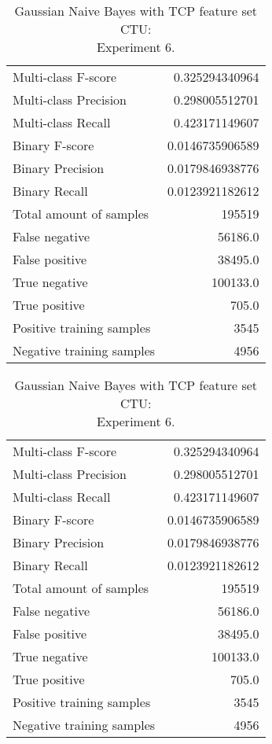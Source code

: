 \begin{table}[H]
\begin{minipage}{0.5\textwidth}
\caption{Gaussian Naive Bayes with TCP feature set CTU: \\Experiment 5.}
\centering
\begin{tabular}{l r}
\toprule
Multi-class F-score & 0.325294340964 \\
Multi-class Precision & 0.298005512701 \\
Multi-class Recall & 0.423171149607 \\
\midrule
Binary F-score & 0.0146735906589 \\
Binary Precision & 0.0179846938776 \\
Binary Recall & 0.0123921182612 \\
\midrule
Total amount of samples & 195519 \\
False negative & 56186.0 \\
False positive & 38495.0 \\
True negative & 100133.0 \\
True positive & 705.0 \\
\midrule
Positive training samples & 3545 \\
Negative training samples & 4956 \\
\bottomrule
\end{tabular}
\end{minipage}
\hfillx
\begin{minipage}{0.5\textwidth}
\caption{Gaussian Naive Bayes with TCP feature set CTU: \\Experiment 6.}
\centering
\begin{tabular}{l r}
\toprule
Multi-class F-score & 0.325294340964 \\
Multi-class Precision & 0.298005512701 \\
Multi-class Recall & 0.423171149607 \\
\midrule
Binary F-score & 0.0146735906589 \\
Binary Precision & 0.0179846938776 \\
Binary Recall & 0.0123921182612 \\
\midrule
Total amount of samples & 195519 \\
False negative & 56186.0 \\
False positive & 38495.0 \\
True negative & 100133.0 \\
True positive & 705.0 \\
\midrule
Positive training samples & 3545 \\
Negative training samples & 4956 \\
\bottomrule
\end{tabular}
\end{minipage}
\end{table}
